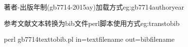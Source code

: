 \begin{example}{著者-出版年制(gb7714-2015ay)加载方式}{eg:gb7714authoryear}
\begin{texlist}
\usepackage[backend=biber,style=gb7714-2015ay]{biblatex}
\usepackage[backend=biber,style=gb7714-2015ay,gbpub=false,gbnoauthor=true]{biblatex}
\usepackage[backend=biber,style=gb7714-2015ay,gbcodegbk=true]{biblatex}
\end{texlist}
\end{example}

\begin{example}{参考文献文本转换为bib文件perl脚本使用方式}{eg:transtobib}
\begin{texlist}
perl gb7714texttobib.pl in=textfilename out=bibfilename
\end{texlist}
\end{example}


